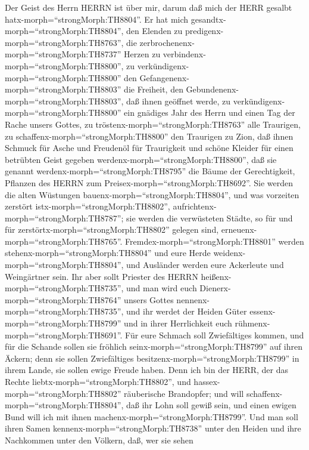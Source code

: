  Der Geist des Herrn HERRN ist über mir, darum daß mich der
HERR gesalbt hatx-morph=``strongMorph:TH8804''. Er hat mich
gesandtx-morph=``strongMorph:TH8804'', den Elenden zu
predigenx-morph=``strongMorph:TH8763'', die
zerbrochenenx-morph=``strongMorph:TH8737'' Herzen zu
verbindenx-morph=``strongMorph:TH8800'', zu
verkündigenx-morph=``strongMorph:TH8800'' den
Gefangenenx-morph=``strongMorph:TH8803'' die Freiheit, den
Gebundenenx-morph=``strongMorph:TH8803'', daß ihnen geöffnet werde,
 zu verkündigenx-morph=``strongMorph:TH8800'' ein gnädiges
Jahr des Herrn und einen Tag der Rache unsers Gottes, zu
tröstenx-morph=``strongMorph:TH8763'' alle Traurigen,  zu
schaffenx-morph=``strongMorph:TH8800'' den Traurigen zu Zion, daß ihnen
Schmuck für Asche und Freudenöl für Traurigkeit und schöne Kleider für
einen betrübten Geist gegeben werdenx-morph=``strongMorph:TH8800'', daß
sie genannt werdenx-morph=``strongMorph:TH8795'' die Bäume der
Gerechtigkeit, Pflanzen des HERRN zum
Preisex-morph=``strongMorph:TH8692''.  Sie werden die alten
Wüstungen bauenx-morph=``strongMorph:TH8804'', und was vorzeiten
zerstört istx-morph=``strongMorph:TH8802'',
aufrichtenx-morph=``strongMorph:TH8787''; sie werden die verwüsteten
Städte, so für und für zerstörtx-morph=``strongMorph:TH8802'' gelegen
sind, erneuenx-morph=``strongMorph:TH8765''. 
Fremdex-morph=``strongMorph:TH8801'' werden
stehenx-morph=``strongMorph:TH8804'' und eure Herde
weidenx-morph=``strongMorph:TH8804'', und Ausländer werden eure
Ackerleute und Weingärtner sein.  Ihr aber sollt Priester
des HERRN heißenx-morph=``strongMorph:TH8735'', und man wird euch
Dienerx-morph=``strongMorph:TH8764'' unsers Gottes
nennenx-morph=``strongMorph:TH8735'', und ihr werdet der Heiden Güter
essenx-morph=``strongMorph:TH8799'' und in ihrer Herrlichkeit euch
rühmenx-morph=``strongMorph:TH8691''.  Für eure Schmach soll
Zwiefältiges kommen, und für die Schande sollen sie fröhlich
seinx-morph=``strongMorph:TH8799'' auf ihren Äckern; denn sie sollen
Zwiefältiges besitzenx-morph=``strongMorph:TH8799'' in ihrem Lande, sie
sollen ewige Freude haben.  Denn ich bin der HERR, der das
Rechte liebtx-morph=``strongMorph:TH8802'', und
hassex-morph=``strongMorph:TH8802'' räuberische Brandopfer; und will
schaffenx-morph=``strongMorph:TH8804'', daß ihr Lohn soll gewiß sein,
und einen ewigen Bund will ich mit ihnen
machenx-morph=``strongMorph:TH8799''.  Und man soll ihren
Samen kennenx-morph=``strongMorph:TH8738'' unter den Heiden und ihre
Nachkommen unter den Völkern, daß, wer sie sehen
